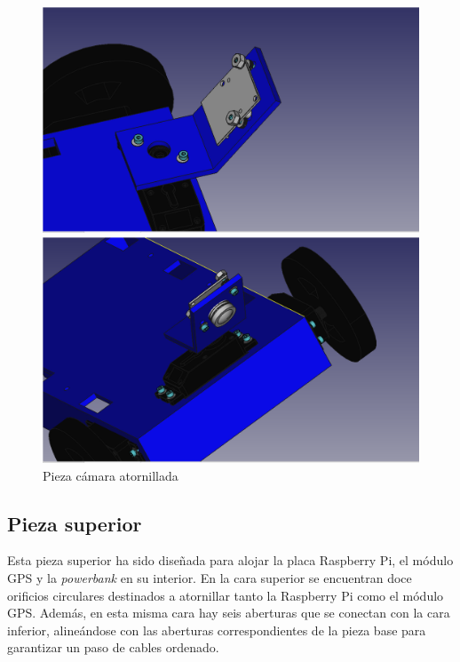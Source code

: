 \begin{figure}[ht!]
	\centering
	\begin{minipage}{0.45\linewidth}
		\centering
		\includegraphics[width=\linewidth]{figs/cap5/camera2con.png}
		\caption*{\centering}
	\end{minipage}
	\hspace{1cm}
	\begin{minipage}{0.45\linewidth}
		\centering
		\includegraphics[width=\linewidth]{figs/cap5/camera3con.png}
		\caption*{\centering}
	\end{minipage}
	\caption{Pieza cámara atornillada}
	\label{fig:pcamaramontada}
\end{figure}


\subsection{Pieza superior}


Esta pieza superior ha sido diseñada para alojar la placa Raspberry Pi, el módulo GPS y la \textit{powerbank} en su interior. En la cara superior se encuentran doce orificios circulares destinados a atornillar tanto la Raspberry Pi como el módulo GPS. Además, en esta misma cara hay seis aberturas que se conectan con la cara inferior, alineándose con las aberturas correspondientes de la pieza base para garantizar un paso de cables ordenado.

